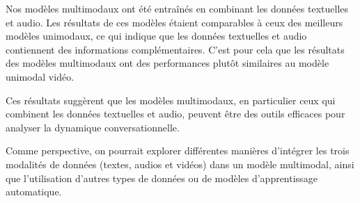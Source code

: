 \documentclass[a4paper]{article}
\begin{document}
Nos modèles multimodaux ont été entraînés en combinant les données textuelles et audio. 
Les résultats de ces modèles étaient comparables à ceux des meilleurs modèles unimodaux, ce qui indique que les données textuelles et audio contiennent des informations complémentaires.
C'est pour cela que les résultats des modèles multimodaux ont des performances plutôt similaires au modèle unimodal vidéo. 

Ces résultats suggèrent que les modèles multimodaux, en particulier ceux qui combinent les données textuelles et audio, peuvent être des outils efficaces pour analyser la dynamique conversationnelle. 

Comme perspective, on pourrait explorer différentes manières d'intégrer les trois modalités de données (textes, audios et vidéos) dans un modèle multimodal, 
ainsi que l'utilisation d'autres types de données ou de modèles d'apprentissage automatique. 

\newpage
\printbibliography
\end{document}
